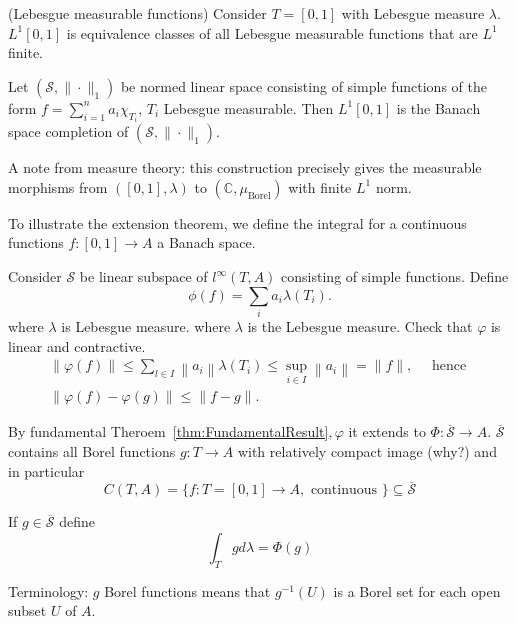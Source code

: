 \begin{example}(Lebesgue measurable functions)
	Consider $T = [0,1]$ with Lebesgue measure $\lambda$. $L^1[0,1]$ is equivalence classes of all Lebesgue measurable functions that are  $L^1$ finite.

	Let $(\mathscr{S}, \|\cdot \|_1)$ be normed linear space consisting of simple functions of the form $f = \sum _{i = 1}^n a_i \chi_{T_i}$, $T_i$ Lebesgue measurable. Then $L^1[0,1]$ is the Banach space completion of $(\mathscr{S}, \|\cdot \|_1)$.
\end{example}
A note from measure theory: this construction precisely gives the measurable morphisms from $([0,1], \lambda)$ to $(\mathbb{C}, \mu_{\text{Borel}})$ with finite $L^1$ norm. 

\begin{example}
	To illustrate the extension theorem, we define the integral for a continuous functions $f: [0,1] \to A$ a Banach space.

	Consider $\mathscr{S}$ be linear subspace of $l^\infty (T, A)$ consisting of simple functions. Define
	\[
		\phi(f) = \sum_i a_i \lambda(T_i)
	.\] 
	where $\lambda$ is Lebesgue measure. where $\lambda$ is the Lebesgue measure. Check that $\varphi$ is linear and contractive.
\[
\begin{gathered}
\|\varphi(f)\| \leqslant \sum_{l \in I}\left\|a_i\right\| \lambda\left(T_i\right) \leqslant \sup _{i \in I}\left\|a_i\right\|=\|f\|, \quad \text { hence } \\
\|\varphi(f)-\varphi(g)\| \leqslant\|f-g\| .
\end{gathered}
\]

By fundamental Theroem~\ref{thm:FundamentalResult}$, \varphi$ it extends to $\Phi: \overline{\mathcal{S}} \rightarrow A$.
$\overline{\mathcal{S}}$ contains all Borel functions $g: T \rightarrow A$ with relatively compact image (why?) and in particular
\[
C(T, A)=\{f: T=[0,1] \rightarrow A, \text { continuous }\} \subseteq \overline{\mathcal{S}}
\]

If $g \in \overline{\mathcal{S}}$ define
\[
\int_T g d \lambda=\Phi(g)
\]

Terminology: $g$ Borel functions means that $g^{-1}(U)$ is a Borel set for each open subset $U$ of $A$.
\end{example}



